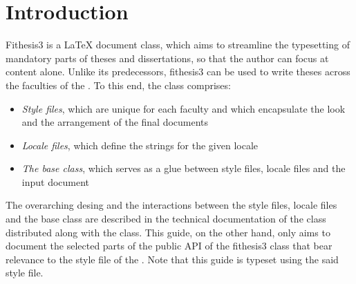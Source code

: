 \documentclass[color,table,cover,twoside,lot,lof]{../../fithesis3}
\begin{document}
  \makeatletter\thesis@preamble\makeatother
  \chapter{Introduction} \textsf{Fithesis3} is a \LaTeX{} document
  class, which aims to streamline the typesetting of mandatory
  parts of theses and dissertations, so that the author can focus
  at content alone. Unlike its predecessors, \textsf{fithesis3} can
  be used to write theses across the faculties of the
  \makeatletter\thesis@english@universityName\makeatother. To this
  end, the class comprises:
  \begin{itemize}
    \item\emph{Style files}, which are unique for each faculty and
      which encapsulate the look and the arrangement of the final
      documents
    \item\emph{Locale files}, which define the strings for the
      given locale
    \item\emph{The base class}, which serves as a glue between
      style files, locale files and the input document
  \end{itemize}
  The overarching desing and the interactions between the style
  files, locale files and the base class are described in the
  technical documentation of the class \cite{novotny15} distributed
  along with the class. This guide, on the other hand, only aims to
  document the selected parts of the public API of the
  \textsf{fithesis3} class that bear relevance to the style file of
  the \makeatletter\thesis@english@facultyName\makeatother. Note
  that this guide is typeset using the said style file.
\end{document}
